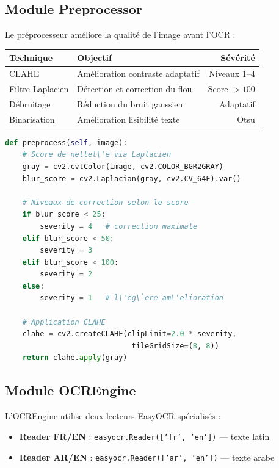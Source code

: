 \documentclass[12pt,a4paper]{report}
\newcommand{\code}[1]{\texttt{\small #1}}
\begin{document}
\subsection{Module Preprocessor}

Le pr\'eprocesseur am\'eliore la qualit\'e de l'image avant l'OCR :

\begin{center}
\begin{tabular}{llr}
\toprule
\textbf{Technique} & \textbf{Objectif} & \textbf{S\'ev\'erit\'e} \\
\midrule
CLAHE & Am\'elioration contraste adaptatif & Niveaux 1--4 \\
Filtre Laplacien & D\'etection et correction du flou & Score $> 100$ \\
D\'ebruitage & R\'eduction du bruit gaussien & Adaptatif \\
Binarisation & Am\'elioration lisibilit\'e texte & Otsu \\
\bottomrule
\end{tabular}
\end{center}

\begin{codebox}
\begin{lstlisting}[language=Python]
def preprocess(self, image):
    # Score de nettet\'e via Laplacien
    gray = cv2.cvtColor(image, cv2.COLOR_BGR2GRAY)
    blur_score = cv2.Laplacian(gray, cv2.CV_64F).var()
    
    # Niveaux de correction selon le score
    if blur_score < 25:
        severity = 4   # correction maximale
    elif blur_score < 50:
        severity = 3
    elif blur_score < 100:
        severity = 2
    else:
        severity = 1   # l\'eg\`ere am\'elioration
    
    # Application CLAHE
    clahe = cv2.createCLAHE(clipLimit=2.0 * severity,
                             tileGridSize=(8, 8))
    return clahe.apply(gray)
\end{lstlisting}
\end{codebox}

\subsection{Module OCREngine}

L'OCREngine utilise deux lecteurs EasyOCR sp\'ecialis\'es :

\begin{itemize}
  \item \textbf{Reader FR/EN} : \code{easyocr.Reader(['fr', 'en'])} --- texte latin
  \item \textbf{Reader AR/EN} : \code{easyocr.Reader(['ar', 'en'])} --- texte arabe
\end{itemize}
\end{document}
